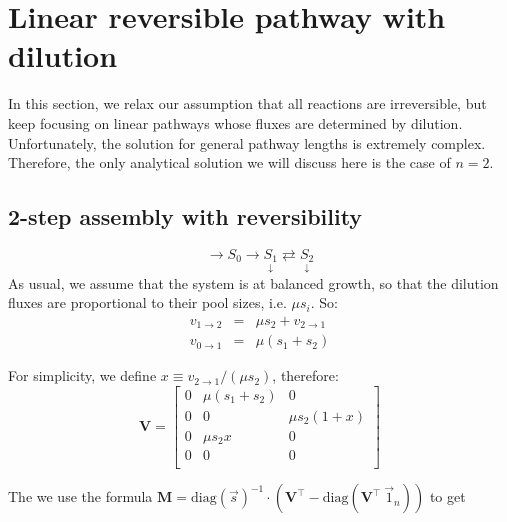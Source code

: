 \documentclass{article}
\newcommand{\flux}[2]{\ensuremath{v_{{#1} \rightarrow {#2}}}}
\begin{document}
\section{Linear reversible pathway with dilution}
In this section, we relax our assumption that all reactions are irreversible, but keep focusing on linear pathways whose fluxes are determined by dilution. Unfortunately, the solution for general pathway lengths is extremely complex. Therefore, the only analytical solution we will discuss here is the case of $n = 2$.

\subsection{2-step assembly with reversibility}

\begin{equation}
    \rightarrow S_0 
    \rightarrow \underset{\downarrow}{S_1}
    \rightleftarrows \underset{\downarrow}{S_2}
\end{equation}
As usual, we assume that the system is at balanced growth, so that the dilution fluxes are proportional to their pool sizes, i.e. $\mu s_i$. So:
\begin{eqnarray}
    \flux{1}{2} &=& \mu s_2 + \flux{2}{1}\\
    \flux{0}{1} &=& \mu (s_1 + s_2)
\end{eqnarray}

For simplicity, we define $x \equiv \flux{2}{1} / (\mu s_2)$, therefore:
\[\mathbf{V} =
    \begin{bmatrix}
        0 & \mu (s_1 + s_2) & 0\\
        0 & 0 & \mu s_2 (1 + x) \\
        0 & \mu s_2 x & 0 \\
        0 & 0 & 0 \\
    \end{bmatrix}
\]

The we use the formula $\mathbf{M} = \text{diag}(\vec{s})^{-1} \cdot \left( \mathbf{V}^\top - \text{diag}(\mathbf{V}^\top~\vec{1}_n) \right)$ to get
\end{document}
